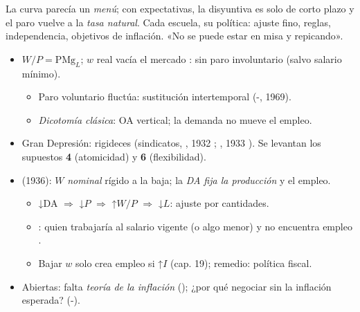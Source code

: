 \documentclass{article}
\begin{document}
\begin{columnas}
\begin{ideaclave}
La curva parecía un \emph{menú}; con expectativas, la disyuntiva es solo de corto plazo y el paro vuelve a la \emph{tasa natural}. Cada escuela, su política: ajuste fino, reglas, independencia, objetivos de inflación. «No se puede estar en misa y repicando».
\end{ideaclave}
\begin{itemize}
\item $W/P=\mathrm{PMg}_L$; $w$ real vacía el mercado : sin paro involuntario (salvo salario mínimo).
  \begin{itemize}
  \item Paro voluntario fluctúa: sustitución intertemporal (-, 1969).
  \item \emph{Dicotomía clásica}: OA vertical; la demanda no mueve el empleo.
  \end{itemize}
\item Gran Depresión: rigideces (sindicatos, , 1932 ; , 1933 ). Se levantan los supuestos \textbf{4} (atomicidad) y \textbf{6} (flexibilidad).
\end{itemize}
\begin{itemize}
\item {} (1936): $W$ \emph{nominal} rígido a la baja; la \emph{DA fija la producción} y el empleo.
  \begin{itemize}
  \item ↓DA $\Rightarrow$ ↓$P$ $\Rightarrow$ ↑$W/P$ $\Rightarrow$ ↓$L$: ajuste por cantidades.
  \item {}: quien trabajaría al salario vigente (o algo menor) y no encuentra empleo .
  \item Bajar $w$ solo crea empleo si ↑$I$ (cap. 19); remedio: política fiscal.
  \end{itemize}
\item Abiertas: falta \emph{teoría de la inflación} (); ¿por qué negociar sin la inflación esperada? (-).
\end{itemize}


\end{columnas}
\end{document}
